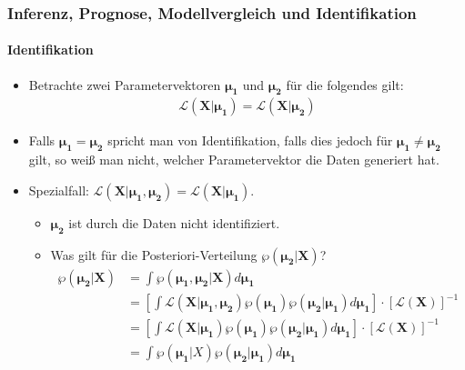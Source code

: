 \documentclass{beamer} %
\begin{document}
\begin{frame}\frametitle{Inferenz, Prognose, Modellvergleich und Identifikation}\framesubtitle{Identifikation}
  \begin{itemize}
    \item Betrachte zwei Parametervektoren $\boldsymbol{\mu_1}$ und $\boldsymbol{\mu_2}$ für die folgendes gilt:
    \begin{align*}
    \mathcal{L}(\mathbf{X}|\boldsymbol{\mu_1}) = \mathcal{L}(\mathbf{X}|\boldsymbol{\mu_2})
    \end{align*}
    \item Falls $\boldsymbol{\mu_1} = \boldsymbol{\mu_2}$ spricht man von Identifikation, falls dies jedoch für $\boldsymbol{\mu_1} \neq \boldsymbol{\mu_2}$  gilt, so weiß man nicht, welcher Parametervektor die Daten generiert hat.
    \item Spezialfall: $\mathcal{L}(\mathbf{X}|\boldsymbol{\mu_1},\boldsymbol{\mu_2}) = \mathcal{L}(\mathbf{X}|\boldsymbol{\mu_1})$.
    \begin{itemize}
    \item $\boldsymbol{\mu_2}$ ist durch die Daten nicht identifiziert.
    \item Was gilt für die Posteriori-Verteilung $\wp(\boldsymbol{\mu_2}|\mathbf{X})$?
    \scriptsize\begin{align*}
  \wp(\boldsymbol{\mu_2}|\mathbf{X}) &= \int \wp(\boldsymbol{\mu_1},\boldsymbol{\mu_2}|\mathbf{X}) d \boldsymbol{\mu_1}\\
  &=  \left[\int\mathcal{L}(\mathbf{X}|\boldsymbol{\mu_1},\boldsymbol{\mu_2})\wp(\boldsymbol{\mu_1})\wp(\boldsymbol{\mu_2}|\boldsymbol{\mu_1}) d \boldsymbol{\mu_1}\right] \cdot [\mathcal{L}(\mathbf{X})]^{-1}\\
  &=  \left[\int\mathcal{L}(\mathbf{X}|\boldsymbol{\mu_1})\wp(\boldsymbol{\mu_1})\wp(\boldsymbol{\mu_2}|\boldsymbol{\mu_1}) d \boldsymbol{\mu_1}\right] \cdot [\mathcal{L}(\mathbf{X})]^{-1}\\
  &= \int \wp(\boldsymbol{\mu_1}|X)\wp(\boldsymbol{\mu_2}|\boldsymbol{\mu_1})d \boldsymbol{\mu_1}
    \end{align*}
    \end{itemize}
  \end{itemize}
\end{frame}
\end{document}
